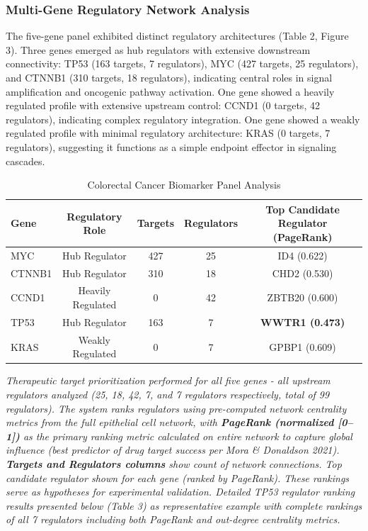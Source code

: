\documentclass[11pt]{article}
\begin{document}
\subsubsection{Multi-Gene Regulatory Network Analysis}

The five-gene panel exhibited distinct regulatory architectures (Table 2, Figure 3). Three genes emerged as hub regulators with extensive downstream connectivity: TP53 (163 targets, 7 regulators), MYC (427 targets, 25 regulators), and CTNNB1 (310 targets, 18 regulators), indicating central roles in signal amplification and oncogenic pathway activation. One gene showed a heavily regulated profile with extensive upstream control: CCND1 (0 targets, 42 regulators), indicating complex regulatory integration. One gene showed a weakly regulated profile with minimal regulatory architecture: KRAS (0 targets, 7 regulators), suggesting it functions as a simple endpoint effector in signaling cascades.

\begin{table}[htbp]
\centering
\caption{Colorectal Cancer Biomarker Panel Analysis}
\begin{tabular}{lcccc}
\toprule
\textbf{Gene} & \textbf{Regulatory Role} & \textbf{Targets} & \textbf{Regulators} & \textbf{Top Candidate Regulator (PageRank)} \\
\midrule
MYC & Hub Regulator & 427 & 25 & ID4 (0.622) \\
CTNNB1 & Hub Regulator & 310 & 18 & CHD2 (0.530) \\
CCND1 & Heavily Regulated & 0 & 42 & ZBTB20 (0.600) \\
TP53 & Hub Regulator & 163 & 7 & \textbf{WWTR1 (0.473)} \\
KRAS & Weakly Regulated & 0 & 7 & GPBP1 (0.609) \\
\bottomrule
\end{tabular}
\label{tab:crc_panel}
\end{table}

\textit{Therapeutic target prioritization performed for all five genes - all upstream regulators analyzed (25, 18, 42, 7, and 7 regulators respectively, total of 99 regulators). The system ranks regulators using pre-computed network centrality metrics from the full epithelial cell network, with \textbf{PageRank (normalized [0--1])} as the primary ranking metric calculated on entire network to capture global influence (best predictor of drug target success per Mora \& Donaldson 2021). \textbf{Targets and Regulators columns} show count of network connections. Top candidate regulator shown for each gene (ranked by PageRank). These rankings serve as hypotheses for experimental validation. Detailed TP53 regulator ranking results presented below (Table 3) as representative example with complete rankings of all 7 regulators including both PageRank and out-degree centrality metrics.}
\end{document}
